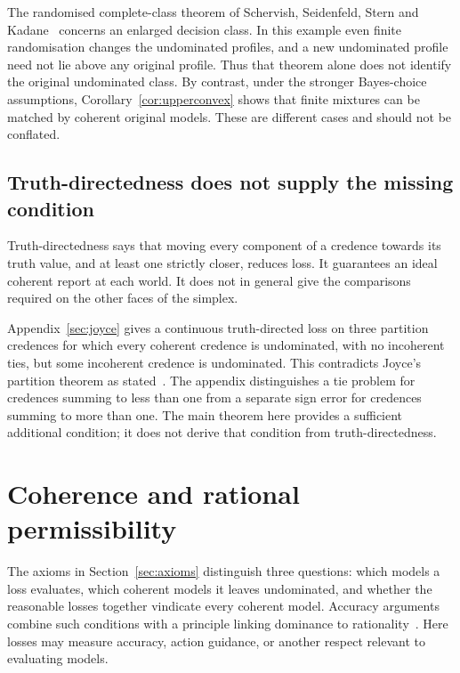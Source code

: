 \documentclass[11pt]{article}
\theoremstyle{definition}
\theoremstyle{remark}
\begin{document}
The randomised complete-class theorem of Schervish, Seidenfeld, Stern and Kadane~\cite[Theorem~1]{SSSK} concerns an enlarged decision class. In this example even finite randomisation changes the undominated profiles, and a new undominated profile need not lie above any original profile. Thus that theorem alone does not identify the original undominated class. By contrast, under the stronger Bayes-choice assumptions, Corollary~\ref{cor:upperconvex} shows that finite mixtures can be matched by coherent original models. These are different cases and should not be conflated.

\subsection{Truth-directedness does not supply the missing condition}
Truth-directedness says that moving every component of a credence towards its truth value, and at least one strictly closer, reduces loss. It guarantees an ideal coherent report at each world. It does not in general give the comparisons required on the other faces of the simplex.

Appendix~\ref{sec:joyce} gives a continuous truth-directed loss on three partition credences for which every coherent credence is undominated, with no incoherent ties, but some incoherent credence is undominated. This contradicts Joyce's partition theorem as stated~\cite[Theorem~2]{Joyce}. The appendix distinguishes a tie problem for credences summing to less than one from a separate sign error for credences summing to more than one. The main theorem here provides a sufficient additional condition; it does not derive that condition from truth-directedness.

\section{Coherence and rational permissibility}\label{sec:argument}
The axioms in Section~\ref{sec:axioms} distinguish three questions: which models a loss evaluates, which coherent models it leaves undominated, and whether the reasonable losses together vindicate every coherent model. Accuracy arguments combine such conditions with a principle linking dominance to rationality~\cite{Joyce,Pettigrew}. Here losses may measure accuracy, action guidance, or another respect relevant to evaluating models.
\end{document}
